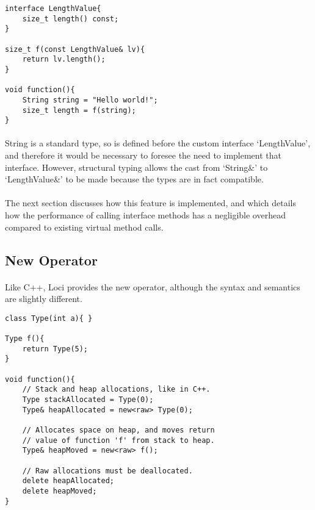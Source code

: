 \documentclass[12pt,twoside,notitlepage]{report}
\begin{document}
\begin{lstlisting}
interface LengthValue{
	size_t length() const;
}

size_t f(const LengthValue& lv){
	return lv.length();
}

void function(){
	String string = "Hello world!";
	size_t length = f(string);
}
\end{lstlisting}


\paragraph{}
String is a standard type, so is defined before the custom interface `LengthValue', and therefore it would be necessary to foresee the need to implement that interface. However, structural typing allows the cast from `String\&' to `LengthValue\&' to be made because the types are in fact compatible.

\paragraph{}
The next section discusses how this feature is implemented, and which details how the performance of calling interface methods has a negligible overhead compared to existing virtual method calls.

\clearpage

\subsection{New Operator}

\paragraph{}
Like C++, Loci provides the new operator, although the syntax and semantics are slightly different.


\begin{lstlisting}
class Type(int a){ }

Type f(){
	return Type(5);
}

void function(){
	// Stack and heap allocations, like in C++.
	Type stackAllocated = Type(0);
	Type& heapAllocated = new<raw> Type(0);
	
	// Allocates space on heap, and moves return
	// value of function 'f' from stack to heap.
	Type& heapMoved = new<raw> f();
	
	// Raw allocations must be deallocated.
	delete heapAllocated;
	delete heapMoved;
}
\end{lstlisting}
\end{document}
